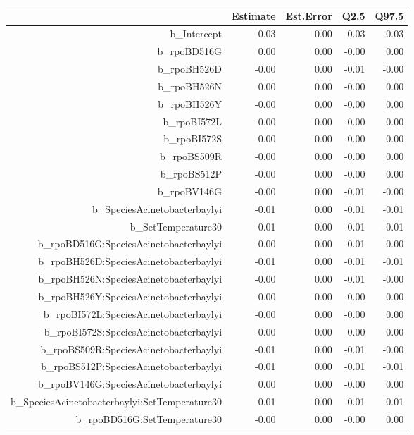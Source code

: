 \begin{table}[ht]
\centering
\begin{tabular}{rrrrr}
  \hline
 & Estimate & Est.Error & Q2.5 & Q97.5 \\ 
  \hline
b\_Intercept & 0.03 & 0.00 & 0.03 & 0.03 \\ 
  b\_rpoBD516G & 0.00 & 0.00 & -0.00 & 0.00 \\ 
  b\_rpoBH526D & -0.00 & 0.00 & -0.01 & -0.00 \\ 
  b\_rpoBH526N & 0.00 & 0.00 & -0.00 & 0.00 \\ 
  b\_rpoBH526Y & -0.00 & 0.00 & -0.00 & 0.00 \\ 
  b\_rpoBI572L & -0.00 & 0.00 & -0.00 & 0.00 \\ 
  b\_rpoBI572S & 0.00 & 0.00 & -0.00 & 0.00 \\ 
  b\_rpoBS509R & -0.00 & 0.00 & -0.00 & 0.00 \\ 
  b\_rpoBS512P & -0.00 & 0.00 & -0.00 & 0.00 \\ 
  b\_rpoBV146G & -0.00 & 0.00 & -0.01 & -0.00 \\ 
  b\_SpeciesAcinetobacterbaylyi & -0.01 & 0.00 & -0.01 & -0.01 \\ 
  b\_SetTemperature30 & -0.01 & 0.00 & -0.01 & -0.01 \\ 
  b\_rpoBD516G:SpeciesAcinetobacterbaylyi & -0.00 & 0.00 & -0.01 & 0.00 \\ 
  b\_rpoBH526D:SpeciesAcinetobacterbaylyi & -0.01 & 0.00 & -0.01 & -0.01 \\ 
  b\_rpoBH526N:SpeciesAcinetobacterbaylyi & -0.00 & 0.00 & -0.01 & -0.00 \\ 
  b\_rpoBH526Y:SpeciesAcinetobacterbaylyi & -0.00 & 0.00 & -0.00 & 0.00 \\ 
  b\_rpoBI572L:SpeciesAcinetobacterbaylyi & -0.00 & 0.00 & -0.00 & 0.00 \\ 
  b\_rpoBI572S:SpeciesAcinetobacterbaylyi & -0.00 & 0.00 & -0.00 & 0.00 \\ 
  b\_rpoBS509R:SpeciesAcinetobacterbaylyi & -0.01 & 0.00 & -0.01 & -0.00 \\ 
  b\_rpoBS512P:SpeciesAcinetobacterbaylyi & -0.01 & 0.00 & -0.01 & -0.01 \\ 
  b\_rpoBV146G:SpeciesAcinetobacterbaylyi & 0.00 & 0.00 & -0.00 & 0.00 \\ 
  b\_SpeciesAcinetobacterbaylyi:SetTemperature30 & 0.01 & 0.00 & 0.01 & 0.01 \\ 
  b\_rpoBD516G:SetTemperature30 & -0.00 & 0.00 & -0.00 & 0.00 \\ 

\end{tabular}
\end{table}
